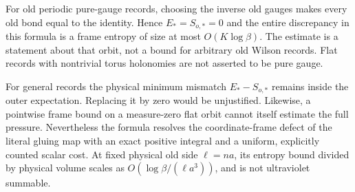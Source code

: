 \documentclass{article}
\begin{document}
For old periodic pure-gauge records, choosing the inverse old gauges makes every old bond equal to the identity. Hence $E_*=S_{o,*}=0$ and the entire discrepancy in this formula is a frame entropy of size at most $O(K\log\beta)$. The estimate is a statement about that orbit, not a bound for arbitrary old Wilson records. Flat records with nontrivial torus holonomies are not asserted to be pure gauge.

For general records the physical minimum mismatch $E_*-S_{o,*}$ remains inside the outer expectation. Replacing it by zero would be unjustified. Likewise, a pointwise frame bound on a measure-zero flat orbit cannot itself estimate the full pressure. Nevertheless the formula resolves the coordinate-frame defect of the literal gluing map with an exact positive integral and a uniform, explicitly counted scalar cost. At fixed physical old side $\ell=na$, its entropy bound divided by physical volume scales as $O(\log\beta/(\ell a^3))$, and is not ultraviolet summable.
\end{document}
